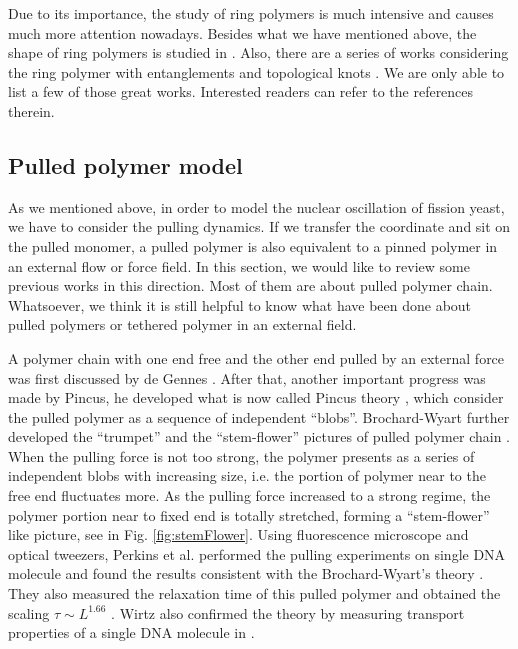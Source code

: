 Due to its importance, the study of ring polymers is much intensive and causes much more attention nowadays. Besides what we have mentioned above, the shape of ring polymers is studied in \cite{Bishop1985,Jagodzinski1992,Alim2007,Reiss2011}. Also, there are a series of works considering the ring polymer with entanglements and topological knots \cite{Michels1982,Polymers1991,Koniaris1991,Grosberg1996,Shimamura2001,Orlandini2003,Tubiana2011,Uehara2014,Li2015a}.
We are only able to list a few of those great works. Interested readers can refer to the references therein. 

\subsection{Pulled polymer model}
\label{sub:pulled_polymer_model}

As we mentioned above, in order to model the nuclear oscillation of fission yeast, we have to consider the pulling dynamics. If we transfer the coordinate and sit on the pulled monomer, a pulled polymer is also equivalent to a pinned polymer in an external flow or force field. In this section, we would like to review some previous works in this direction. Most of them are about pulled polymer chain. Whatsoever, we think it is still helpful to know what have been done about pulled polymers or tethered polymer in an external field.

A polymer chain with one end free and the other end pulled by an external force was first discussed by de Gennes \cite{DeGennes1974,DeGennes1979}. After that, another important progress was made by Pincus, he developed what is now called Pincus theory \cite{Pincus1976,Pincus1977}, which consider the pulled polymer as a sequence of independent ``blobs''.  Brochard-Wyart further developed the ``trumpet'' and the ``stem-flower'' pictures of pulled polymer chain \cite{Brochard-Wyart1993a,Brochard-Wyart1994a,Brochard-Wyart1995,Adjarei1995a}. When the pulling force is not too strong, the polymer presents as a series of independent blobs with increasing size, i.e. the portion of polymer near to the free end fluctuates more. As the pulling force increased to a strong regime, the polymer portion near to fixed end is totally stretched, forming a ``stem-flower'' like picture, see in Fig. \ref{fig:stemFlower}.  
Using fluorescence microscope and optical tweezers,  Perkins et al. performed the pulling experiments on single DNA molecule and found the results consistent with the Brochard-Wyart's theory \cite{Perkins1995a,Perkins1994}. They also measured the relaxation time of this pulled polymer and obtained the scaling $\tau \sim L^{1.66}$ \cite{Perkins1994a}. Wirtz also confirmed the theory by measuring transport properties of a single DNA molecule in \cite{Wirtz1995}.

